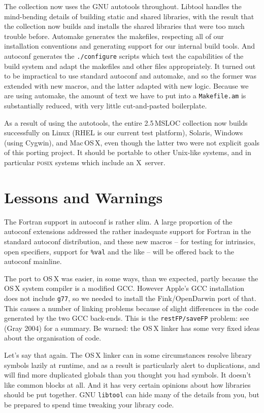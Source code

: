 \documentclass{speauth}
\begin{document}
The collection now uses the GNU autotools throughout.  Libtool handles the
mind-bending details of building static and shared libraries, with the
result that the collection now builds and installs the shared
libraries that were too much trouble before.  Automake generates the
makefiles, respecting all of our installation conventions and
generating support for our internal build tools.  And autoconf
generates the \texttt{./configure} scripts which test the capabilities
of the build system and adapt the makefiles and other files
appropriately.  It turned out to be impractical to use standard
autoconf and automake, and so the former was extended with new macros,
and the latter adapted with new logic.  Because we are using automake,
the amount of text we have to put into a \texttt{Makefile.am} is
substantially reduced, with very little cut-and-pasted boilerplate.

As a result of using the autotools, the entire 2.5\,MSLOC collection
now builds successfully on Linux (RHEL is our current test platform),
Solaris, Windows (using Cygwin), and Mac\,OS\,X, even though the
latter two were not explicit goals of this porting project.  It should
be portable to other Unix-like systems, and in particular
\textsc{posix} systems which include an X~server.



\section{Lessons and Warnings}
\label{s:lessons}

The Fortran support in autoconf is rather slim.  A large proportion of the
autoconf extensions addressed the rather inadequate support for
Fortran in the standard autoconf distribution, and these new macros -- for
testing for intrinsics, open specifiers, support for \texttt{\%val}
and the like -- will be offered back to the autoconf mainline.

The port to OS\,X was easier, in some ways, than we expected, partly
because the OS\,X system compiler is a modified GCC.  However Apple's
GCC installation does not include \texttt{g77}, so we needed to
install the Fink/OpenDarwin port of that.  This causes a number of
linking problems because of slight differences in the code generated
by the two GCC back-ends.  This is the \texttt{restFP/saveFP} problem:
see (Gray 2004) for a summary.  Be warned: the OS\,X linker has some
very fixed ideas about the organisation of code.

Let's say that again.  The OS\,X linker can in some circumstances
resolve library symbols lazily at runtime, and as a result is particularly
alert to duplications, and will find more duplicated
globals than you thought you had symbols.  It doesn't like common
blocks at all.  And it has very certain opinions about how libraries
should be put together.  GNU \texttt{libtool} can hide many of the
details from you, but be prepared to spend time tweaking your library
code.
\end{document}
